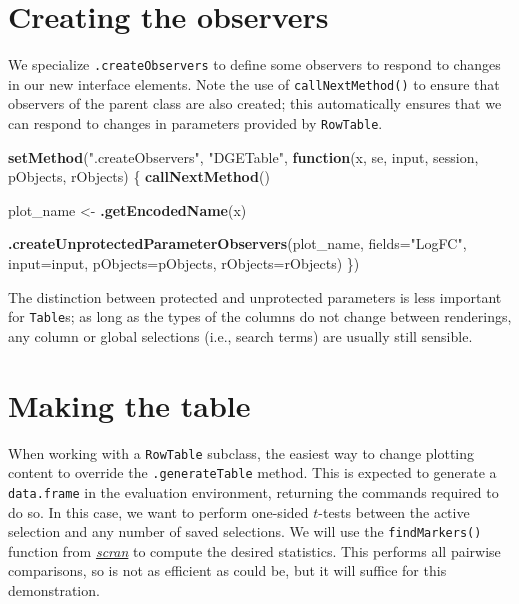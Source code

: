 \documentclass[
]{book}
\newenvironment{Shaded}{\begin{snugshade}}{\end{snugshade}}
\newcommand{\ControlFlowTok}[1]{\textcolor[rgb]{0.13,0.29,0.53}{\textbf{#1}}}
\newcommand{\DataTypeTok}[1]{\textcolor[rgb]{0.13,0.29,0.53}{#1}}
\newcommand{\KeywordTok}[1]{\textcolor[rgb]{0.13,0.29,0.53}{\textbf{#1}}}
\newcommand{\NormalTok}[1]{#1}
\newcommand{\StringTok}[1]{\textcolor[rgb]{0.31,0.60,0.02}{#1}}
\begin{document}
\hypertarget{creating-the-observers}{%
\section{Creating the observers}\label{creating-the-observers}}

We specialize \texttt{.createObservers} to define some observers to respond to changes in our new interface elements.
Note the use of \texttt{callNextMethod()} to ensure that observers of the parent class are also created;
this automatically ensures that we can respond to changes in parameters provided by \texttt{RowTable}.

\begin{Shaded}
\begin{Highlighting}[]
\KeywordTok{setMethod}\NormalTok{(}\StringTok{".createObservers"}\NormalTok{, }\StringTok{"DGETable"}\NormalTok{, }
    \ControlFlowTok{function}\NormalTok{(x, se, input, session, pObjects, rObjects) }
\NormalTok{\{}
    \KeywordTok{callNextMethod}\NormalTok{()}

\NormalTok{    plot_name <-}\StringTok{ }\KeywordTok{.getEncodedName}\NormalTok{(x)}

    \KeywordTok{.createUnprotectedParameterObservers}\NormalTok{(plot_name,}
        \DataTypeTok{fields=}\StringTok{"LogFC"}\NormalTok{,}
        \DataTypeTok{input=}\NormalTok{input, }\DataTypeTok{pObjects=}\NormalTok{pObjects, }\DataTypeTok{rObjects=}\NormalTok{rObjects)}
\NormalTok{\})}
\end{Highlighting}
\end{Shaded}

The distinction between protected and unprotected parameters is less important for \texttt{Table}s;
as long as the types of the columns do not change between renderings, any column or global selections (i.e., search terms) are usually still sensible.

\hypertarget{making-the-table}{%
\section{Making the table}\label{making-the-table}}

When working with a \texttt{RowTable} subclass, the easiest way to change plotting content to override the \texttt{.generateTable} method.
This is expected to generate a \texttt{data.frame} in the evaluation environment, returning the commands required to do so.
In this case, we want to perform one-sided \(t\)-tests between the active selection and any number of saved selections.
We will use the \texttt{findMarkers()} function from \emph{\href{https://bioconductor.org/packages/3.11/scran}{scran}} to compute the desired statistics.
This performs all pairwise comparisons, so is not as efficient as could be, but it will suffice for this demonstration.
\end{document}
